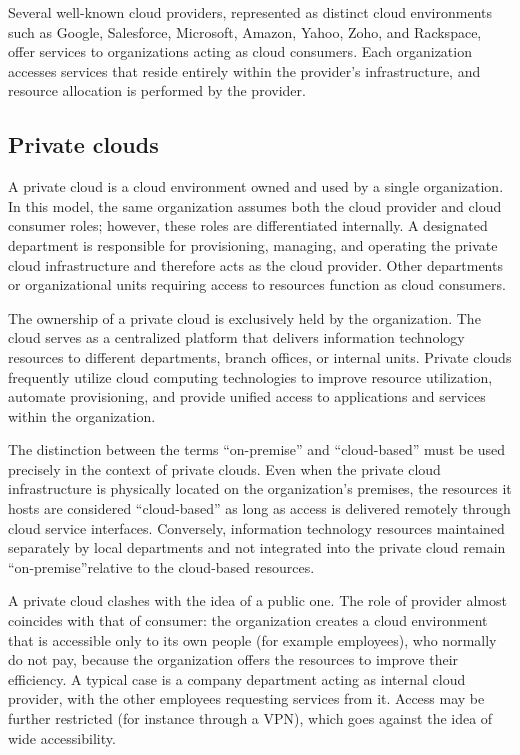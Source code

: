 Several well-known cloud providers, represented as distinct cloud environments such as Google, Salesforce, Microsoft, Amazon, Yahoo, Zoho, and Rackspace, offer services to organizations acting as cloud consumers. Each organization accesses services that reside entirely within the provider's infrastructure, and resource allocation is performed by the provider.

\subsection{Private clouds}

A private cloud is a cloud environment owned and used by a single organization. In this model, the same organization assumes both the cloud provider and cloud consumer roles; however, these roles are differentiated internally. A designated department is responsible for provisioning, managing, and operating the private cloud infrastructure and therefore acts as the cloud provider. Other departments or organizational units requiring access to resources function as cloud consumers.

The ownership of a private cloud is exclusively held by the organization. The cloud serves as a centralized platform that delivers information technology resources to different departments, branch offices, or internal units. Private clouds frequently utilize cloud computing technologies to improve resource utilization, automate provisioning, and provide unified access to applications and services within the organization.

The distinction between the terms ``on-premise'' and ``cloud-based'' must be used precisely in the context of private clouds. Even when the private cloud infrastructure is physically located on the organization's premises, the resources it hosts are considered ``cloud-based'' as long as access is delivered remotely through cloud service interfaces. Conversely, information technology resources maintained separately by local departments and not integrated into the private cloud remain ``on-premise''relative to the cloud-based resources.

A private cloud clashes with the idea of a public one. The role of provider almost coincides with that of consumer: the organization creates a cloud environment that is accessible only to its own people (for example employees), who normally do not pay, because the organization offers the resources to improve their efficiency. A typical case is a company department acting as internal cloud provider, with the other employees requesting services from it. Access may be further restricted (for instance through a VPN), which goes against the idea of wide accessibility.

